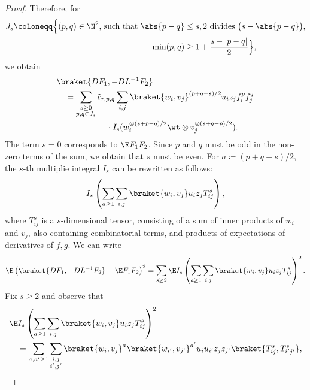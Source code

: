 \begin{proof}
Therefore, for 
\begin{equation}
    \begin{aligned} 
    J_s \coloneqq \Big\{(p, q) \in \N^2 \text{, such that }\abs{p - q} &\le s, 2 \text{ divides } \bigl(s - \abs{p - q}\bigr), \\
     \min(p, q) &\ge 1 + \frac{s - |p - q|}{2}\Big\},
    \end{aligned}
\end{equation} we obtain
\begin{equation}
    \begin{aligned}
    &\braket{DF_1, -DL^{-1}F_2} \\
    &\quad = \sum_{\substack{s \geq 0 \\ p,q \in J_s}} \tilde c_{r,p,q}\sum_{i, j}\braket{w_i, v_j}^{(p+q - s)/2} u_i z_j f^p_i f^q_j \\
    &\qquad \qquad \qquad \cdot I_s(w_i^{\otimes (s + p - q) / 2} \wt \otimes v_j^{\otimes (s + q - p) / 2}).
    \end{aligned}
\end{equation}
The term \(s = 0\) corresponds to \(\E F_1 F_2\). Since \(p\) and \(q\) must be odd in the non-zero terms of the sum, we obtain that \(s\) must be even. For \(a \coloneqq (p+q-s)/2\), the \(s\)-th multiplie integral \(I_s\) can be rewritten as follows:
\begin{equation}
    I_s\left(\sum_{a \geq 1} \sum_{i, j} \braket{w_i, v_j} u_i z_j T_{ij}^s\right),
\end{equation}
where \(T_{ij}^s\) is a \(s\)-dimensional tensor, consisting of a sum of inner products of \(w_i\) and \(v_j\), also containing combinatorial terms, and products of expectations of derivatives of \(f, g\). We can write
\begin{equation}
    \E \left(\braket{D F_1, -DL^{-1} F_2} - \E F_1 F_2\right)^2 = \sum_{s \geq 2} \E I_s\left(\sum_{a \geq 1} \sum_{i,j} \braket{w_i, v_j} u_i z_j T_{ij}^s\right)^2.
\end{equation}
Fix \(s \geq 2\) and observe that 
\begin{equation}
\label{eq:fixed_s_expansion}
\begin{aligned}
    &\E I_s \left(\sum_{a \geq 1} \sum_{i,j} \braket{w_i, v_j} u_i z_j T_{ij}^s\right)^2 \\
    &\quad = 
    \sum_{a,a' \geq 1} \sum_{\substack{i,j\\i', j'}} \braket{w_i, v_j}^a \braket{w_{i'}, v_{j'}}^{a'} u_i u_{i'} z_j z_{j'} \braket{T_{ij}^s, T_{i'j'}^s},
\end{aligned}

\end{equation}
\end{proof}

